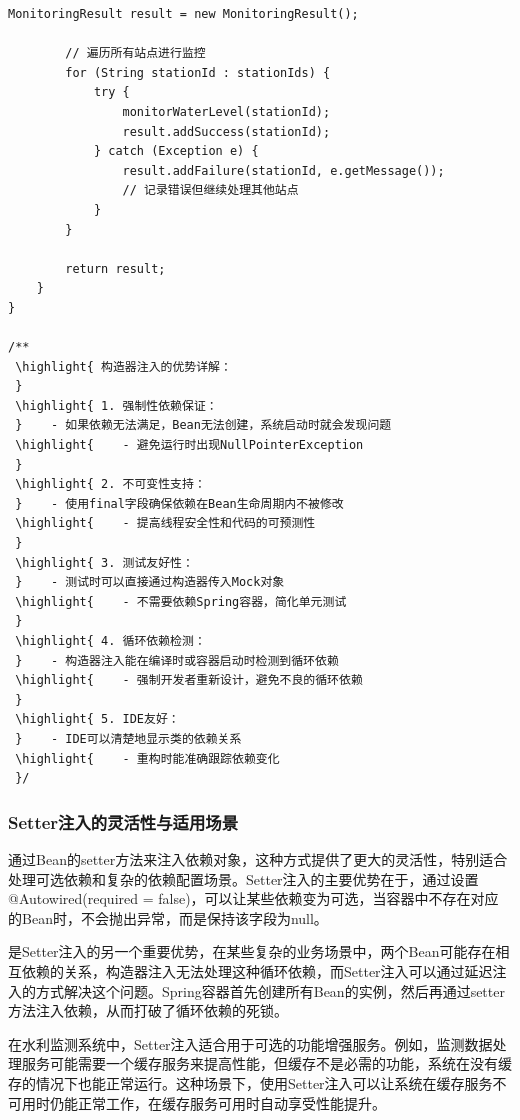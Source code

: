 \begin{lstlisting}[style=java]
        MonitoringResult result = new MonitoringResult();
        
        // 遍历所有站点进行监控
        for (String stationId : stationIds) {
            try {
                monitorWaterLevel(stationId);
                result.addSuccess(stationId);
            } catch (Exception e) {
                result.addFailure(stationId, e.getMessage());
                // 记录错误但继续处理其他站点
            }
        }
        
        return result;
    }
}

/**
 \highlight{ 构造器注入的优势详解：
 } 
 \highlight{ 1. 强制性依赖保证：
 }    - 如果依赖无法满足，Bean无法创建，系统启动时就会发现问题
 \highlight{    - 避免运行时出现NullPointerException
 } 
 \highlight{ 2. 不可变性支持：
 }    - 使用final字段确保依赖在Bean生命周期内不被修改
 \highlight{    - 提高线程安全性和代码的可预测性
 } 
 \highlight{ 3. 测试友好性：
 }    - 测试时可以直接通过构造器传入Mock对象
 \highlight{    - 不需要依赖Spring容器，简化单元测试
 } 
 \highlight{ 4. 循环依赖检测：
 }    - 构造器注入能在编译时或容器启动时检测到循环依赖
 \highlight{    - 强制开发者重新设计，避免不良的循环依赖
 } 
 \highlight{ 5. IDE友好：
 }    - IDE可以清楚地显示类的依赖关系
 \highlight{    - 重构时能准确跟踪依赖变化
 }/
\end{lstlisting}

\hypertarget{setterux6ce8ux5165ux7684ux7075ux6d3bux6027ux4e0eux9002ux7528ux573aux666f}{%
\subsubsection{Setter注入的灵活性与适用场景}\label{setterux6ce8ux5165ux7684ux7075ux6d3bux6027ux4e0eux9002ux7528ux573aux666f}}

通过Bean的setter方法来注入依赖对象，这种方式提供了更大的灵活性，特别适合处理可选依赖和复杂的依赖配置场景。Setter注入的主要优势在于，通过设置@Autowired(required = false)，可以让某些依赖变为可选，当容器中不存在对应的Bean时，不会抛出异常，而是保持该字段为null。

是Setter注入的另一个重要优势，在某些复杂的业务场景中，两个Bean可能存在相互依赖的关系，构造器注入无法处理这种循环依赖，而Setter注入可以通过延迟注入的方式解决这个问题。Spring容器首先创建所有Bean的实例，然后再通过setter方法注入依赖，从而打破了循环依赖的死锁。

在水利监测系统中，Setter注入适合用于可选的功能增强服务。例如，监测数据处理服务可能需要一个缓存服务来提高性能，但缓存不是必需的功能，系统在没有缓存的情况下也能正常运行。这种场景下，使用Setter注入可以让系统在缓存服务不可用时仍能正常工作，在缓存服务可用时自动享受性能提升。

